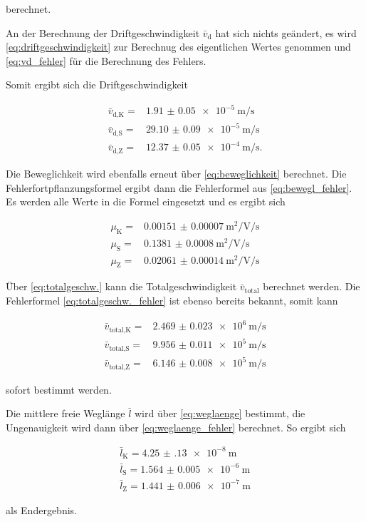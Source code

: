 berechnet.

An der Berechnung der Driftgeschwindigkeit $\bar{v}_\text{d}$ hat sich nichts geändert, es wird \autoref{eq:driftgeschwindigkeit} zur Berechnug des eigentlichen Wertes genommen und \autoref{eq:vd_fehler} für die Berechnung des Fehlers.

Somit ergibt sich die Driftgeschwindigkeit

\begin{align}
    \bar{v}_\text{d,K} =& \SI{1.91(5)e-5}{\meter\per\second} \\
    \bar{v}_\text{d,S} =& \SI{29.10(9)e-5}{\meter\per\second} \\
    \bar{v}_\text{d,Z} =& \SI{12.37(5)e-4}{\meter\per\second}.
    \label{eq:vd2}
\end{align}

Die Beweglichkeit wird ebenfalls erneut über \autoref{eq:beweglichkeit} berechnet.
Die Fehlerfortpflanzungsformel ergibt dann die Fehlerformel aus \autoref{eq:bewegl_fehler}.
Es werden alle Werte in die Formel eingesetzt und es ergibt sich 

\begin{align}
    \mu _\text{K} =& \SI{0.00151(7)}{\meter\squared\per\volt\per\second}\\
    \mu _\text{S} =& \SI{0.1381(8)}{\meter\squared\per\volt\per\second}\\
    \mu _\text{Z} =& \SI{0.02061(14)}{\meter\squared\per\volt\per\second}
    \label{eq:mue2}
\end{align}

Über \autoref{eq:totalgeschw.} kann die Totalgeschwindigkeit $\bar{v}_\text{total}$ berechnet werden.
Die Fehlerformel \autoref{eq:totalgeschw._fehler} ist ebenso bereits bekannt, somit kann 

\begin{align}
    \bar{v}_\text{total,K} =& \SI{2.469(23)e6}{\meter\per\second}\\
    \bar{v}_\text{total,S} =& \SI{9.956(11)e5}{\meter\per\second}\\
    \bar{v}_\text{total,Z} =& \SI{6.146(8)e5}{\meter\per\second}
    \label{eq:vtotal2}
\end{align}

sofort bestimmt werden.

Die mittlere freie Weglänge $\bar{l}$ wird über \autoref{eq:weglaenge} bestimmt, die Ungenauigkeit wird dann über \autoref{eq:weglaenge_fehler} berechnet.
So ergibt sich

\begin{align}
    \bar{l}_\text{K} = \SI{4.25(13)e-8}{\meter}\\
    \bar{l}_\text{S} = \SI{1.564(5)e-6}{\meter}\\
    \bar{l}_\text{Z} = \SI{1.441(6)e-7}{\meter}
    \label{eq:weglaenge2}
\end{align}

als Endergebnis.